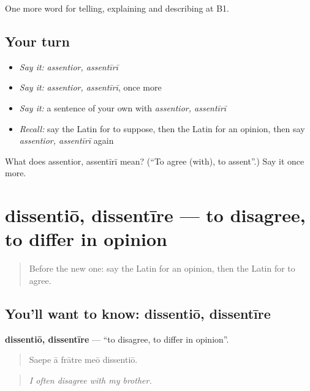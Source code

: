 \begin{grammarlens}[title={What you've built}]
One more word for telling, explaining and describing at B1.
\end{grammarlens}

\subsection*{Your turn}
\begin{itemize}
\raggedright
  \item \emph{Say it:} \emph{assentior, assentīrī}
  \item \emph{Say it:} \emph{assentior, assentīrī}, once more
  \item \emph{Say it:} a sentence of your own with \emph{assentior, assentīrī}
  \item \emph{Recall:} say the Latin for to suppose, then the Latin for an opinion, then say \emph{assentior, assentīrī} again
\end{itemize}

\begin{tcolorbox}[breakable,colback=teal!4,colframe=teal!35!black,title={Before you move on}]
What does assentior, assentīrī mean? (\textquotedblleft{}To agree (with), to assent\textquotedblright{}.) Say it once more.
\end{tcolorbox}
\section[dissentiō, dissentīre]{dissentiō, dissentīre — to disagree, to differ in opinion}

\label{lesson:LA-C358-dissentio}



\begin{quote}
Before the new one: say the Latin for an opinion, then the Latin for to agree.
\end{quote}

\subsection*{You'll want to know: dissentiō, dissentīre}
\textbf{dissentiō, dissentīre} — \textquotedblleft{}to disagree, to differ in opinion\textquotedblright{}.

\begin{quote}
Saepe ā frātre meō dissentiō.
\end{quote}

\begin{quote}
\emph{I often disagree with my brother.}
\end{quote}

